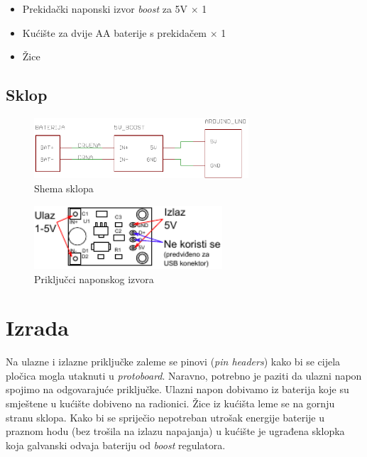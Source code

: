\documentclass[times, utf8, zavrsni, numeric, sort]{fer}
\begin{document}
\begin{itemize}
	\setlength{\itemsep}{0pt}
	\setlength{\parskip}{0pt}
	
	\item Prekidački naponski izvor \textit{boost} za 5V $\times$ 1
	\item Kućište za dvije AA baterije s prekidačem $\times$ 1
	\item Žice
\end{itemize}

\subsection{Sklop}

\begin{figure}[htb]
	\centering
	\includegraphics[width=8cm]{./Sklopovi/5V boost/sklop.pdf}
	\caption{Shema sklopa}
	\label{fig:5Vboost-sch}
\end{figure}

\begin{figure}[htb]
	\centering
	\includegraphics[width=7cm]{./Sklopovi/5V boost/pinout.pdf}
	\caption{Priključci naponskog izvora}
	\label{fig:5Vboost-pinout}
\end{figure}

\section{Izrada}
Na ulazne i izlazne priključke zaleme se pinovi (\textit{pin headers}) kako bi se cijela pločica mogla utaknuti u \textit{protoboard}. Naravno, potrebno je paziti da ulazni napon spojimo na odgovarajuće priključke. Ulazni napon dobivamo iz baterija koje su smještene u kućište dobiveno na radionici. Žice iz kućišta leme se na gornju stranu sklopa. Kako bi se spriječio nepotreban utrošak energije baterije u praznom hodu (bez trošila na izlazu napajanja) u kućište je ugrađena sklopka koja galvanski odvaja bateriju od \textit{boost} regulatora.
\end{document}
